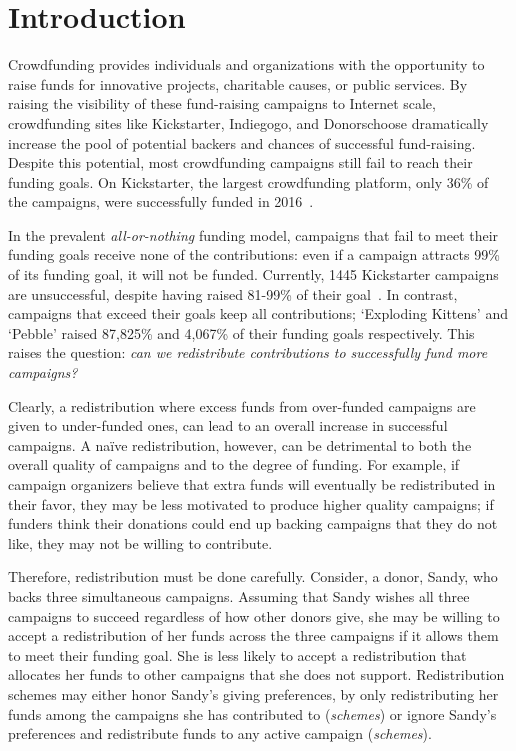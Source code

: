 \section{Introduction}

Crowdfunding provides individuals and organizations with the opportunity to raise funds for 
innovative projects, charitable causes, or public services. By raising the visibility of these fund-raising campaigns to Internet scale, crowdfunding sites like Kickstarter, Indiegogo, and Donorschoose dramatically increase the pool of potential backers and chances of successful fund-raising. Despite this potential, most crowdfunding campaigns still fail to reach their funding goals. On Kickstarter, the largest crowdfunding platform, only 36\% of the campaigns, were successfully funded in 2016~\cite{kickstarterstats}.

In %
the prevalent
\textit{all-or-nothing} funding model, campaigns that fail to meet their funding goals receive none of the contributions: even if a campaign attracts 99\% of its funding goal, it will not be funded. Currently, 1445 Kickstarter campaigns are unsuccessful, despite having raised 81-99\% of their goal~\cite{kickstarterstats}. In contrast, campaigns that exceed their goals keep all contributions; `Exploding Kittens' and `Pebble' raised 87,825\% and 4,067\% of their funding goals respectively. This raises the question: \textit{can we redistribute contributions to successfully fund more campaigns?}

Clearly, a redistribution where excess funds from over-funded campaigns are given to under-funded ones, can lead to an overall increase in successful campaigns. A na\"ive redistribution, however, can be detrimental to both the overall quality of campaigns and to the degree of funding. For example, if campaign organizers believe that extra funds will eventually be redistributed in their favor, they may be less motivated to produce higher quality campaigns; if funders think their donations could end up backing campaigns that they do not like, they may not be willing to contribute.

Therefore, redistribution must be done carefully. Consider, a donor, Sandy, who backs three simultaneous campaigns. Assuming that Sandy wishes all three campaigns to succeed regardless of how other donors give, she may be willing to accept a redistribution of her funds across the three campaigns if it allows them to meet their funding goal. She is less likely to accept a redistribution that allocates her funds to other campaigns that she does not support. Redistribution schemes may either honor Sandy's giving preferences, by only redistributing her funds among the campaigns she has contributed to (\textit{\cpr schemes}) or ignore Sandy's preferences and redistribute funds to any active campaign (\textit{\car schemes}).


